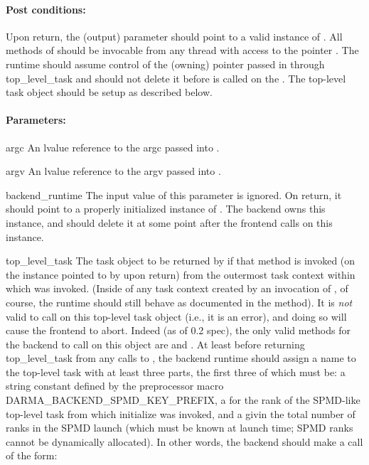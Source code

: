 \paragraph{Post conditions:} Upon return, the (output) parameter  should point to  a valid
   instance of .  All methods of  should be invocable
   from any thread with access to the pointer .  The runtime should assume
   control of the (owning) pointer passed in through top\_level\_task and should not delete
   it before  is called on the .  The top-level
   task object should be setup as described below.
 
\paragraph{Parameters:}
\begin{compactdesc} 
\item[argc] An lvalue reference to the argc passed into .
\item[argv] An lvalue reference to the argv passed into .
\item[backend\_runtime] The input value of this parameter is ignored.  On return, it should
   point to a properly initialized instance of .  The backend owns this
   instance, and should delete it at some point after the frontend calls  on
   this instance.
\item[top\_level\_task] The task object to be returned by  if that
   method is invoked (on the instance pointed to by  upon return) from the outermost
   task context within which  was invoked.  (Inside of any task context
   created by an invocation of , of course, the runtime should still behave as documented
   in the  method).  It is \emph{not} valid to call  on this
   top-level task object (i.e., it is an error), and doing so will cause the frontend to abort.
   Indeed (as of 0.2 spec), the only valid methods for the backend to call on this object are
    and .  At least before returning top\_level\_task from any calls to
   , the backend runtime should assign a name to the top-level task
   with at least three parts, the first three of which must be: a string constant defined by the
   preprocessor macro DARMA\_BACKEND\_SPMD\_KEY\_PREFIX, a  for the rank of the SPMD-like
   top-level task from which initialize was invoked, and a  givin the total number of
   ranks in the SPMD launch (which must be known at launch time; SPMD ranks cannot be dynamically
   allocated).  In other words, the backend should make a call of the form:
\end{compactdesc}

